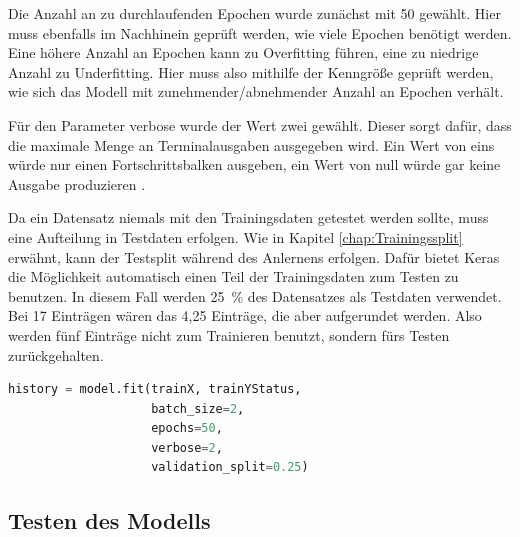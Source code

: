 Die Anzahl an zu durchlaufenden Epochen wurde zunächst mit 50 gewählt. Hier muss ebenfalls im Nachhinein geprüft werden, wie viele Epochen benötigt werden. Eine höhere Anzahl an Epochen kann zu 
Overfitting führen, eine zu niedrige Anzahl zu Underfitting. Hier muss also mithilfe der Kenngröße geprüft werden, wie sich das Modell mit zunehmender/abnehmender Anzahl an Epochen verhält.

Für den Parameter \glqq verbose\grqq{} wurde der Wert zwei gewählt. Dieser sorgt dafür, dass die maximale Menge an Terminalausgaben ausgegeben wird. Ein Wert von eins würde nur einen 
Fortschrittsbalken ausgeben, ein Wert von null würde gar keine Ausgabe produzieren \cite{KerasDoc}.

Da ein Datensatz niemals mit den Trainingsdaten getestet werden sollte, muss eine Aufteilung in Testdaten erfolgen. Wie in Kapitel \ref*{chap:Trainingssplit} erwähnt, kann der Testsplit
während des Anlernens erfolgen. Dafür bietet Keras die Möglichkeit automatisch einen Teil der Trainingsdaten zum Testen zu benutzen.
In diesem Fall werden 25~\% des Datensatzes als Testdaten verwendet. Bei 17 Einträgen wären das 4,25 Einträge, die aber aufgerundet werden. Also werden fünf Einträge 
nicht zum Trainieren benutzt, sondern fürs Testen zurückgehalten.

\begin{lstlisting}[language = python, caption={Trainieren des Modells},captionpos=b, label = lst:TrainModel, float, floatplacement=H]
    history = model.fit(trainX, trainYStatus,
                    batch_size=2,
                    epochs=50,
                    verbose=2,
                    validation_split=0.25)
\end{lstlisting}

\subsection{Testen des Modells}
\label{chap:TestNN}

